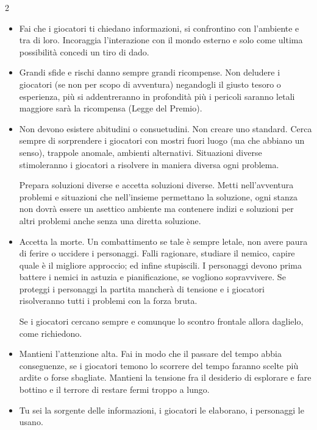 \begin{multicols}{2}
\begin{itemize}[leftmargin=*]
\item
Fai che i giocatori ti chiedano informazioni, si confrontino con l'ambiente e tra di loro. Incoraggia l'interazione con il mondo esterno e solo come ultima possibilità concedi un tiro di dado.

\item
Grandi sfide e rischi danno sempre grandi ricompense. Non deludere i giocatori (se non per scopo di avventura) negandogli il giusto tesoro o esperienza, più si addentreranno in profondità più i pericoli saranno letali maggiore sarà la ricompensa (Legge del Premio).

\item
Non devono esistere abitudini o consuetudini. Non creare uno standard.
Cerca sempre di sorprendere i giocatori con mostri fuori luogo (ma che abbiano un senso), trappole anomale, ambienti alternativi. Situazioni diverse stimoleranno i giocatori a risolvere in maniera diversa ogni problema.

Prepara soluzioni diverse e accetta soluzioni diverse. Metti nell'avventura problemi e situazioni che nell'insieme permettano la soluzione, ogni stanza non dovrà essere un asettico ambiente ma contenere indizi e soluzioni per altri problemi anche senza una diretta soluzione.

\item
Accetta la morte. Un combattimento se tale è sempre letale, non avere paura di ferire o uccidere i personaggi. Falli ragionare, studiare il nemico, capire quale è il migliore approccio; ed infine stupiscili. I personaggi devono prima battere i nemici in astuzia e pianificazione, se vogliono sopravvivere.
Se proteggi i personaggi la partita mancherà di tensione e i giocatori risolveranno tutti i problemi con la forza bruta.

Se i giocatori cercano sempre e comunque lo scontro frontale allora daglielo, come richiedono.

\item
Mantieni l'attenzione alta. Fai in modo che il passare del tempo abbia conseguenze, se i giocatori temono lo scorrere del tempo faranno scelte più ardite o forse sbagliate. Mantieni la tensione fra il desiderio di esplorare e fare bottino e il terrore di restare fermi troppo a lungo.

\item
Tu sei la sorgente delle informazioni, i giocatori le elaborano, i personaggi le usano.


\end{itemize}
\end{multicols}
